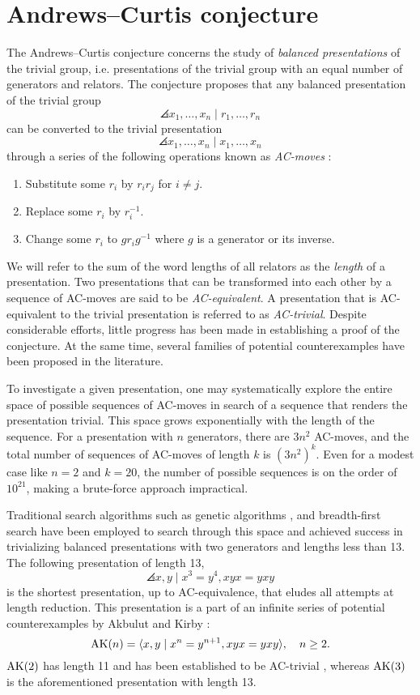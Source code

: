 
\section{Andrews--Curtis conjecture\label{sec:AC}}

The Andrews--Curtis conjecture concerns the study of \textit{balanced presentations} of the trivial group, i.e.
presentations of the trivial group with an equal number of generators and relators.
The conjecture proposes that any balanced presentation of the trivial group
\[
\angles{x_1, \dots, x_n \mid r_1, \dots, r_n}
\]
can be converted to the trivial presentation
\[
\angles{x_1, \dots, x_n \mid x_1, \dots, x_n}
\]
through a series of the following operations known as \textit{AC-moves} \cite{Andrews--Curtis}:
\begin{enumerate}[label=(AC\arabic*)]
	\item Substitute some $r_i$ by $r_i r_j$ for $i \neq j$.
	\item Replace some $r_i$ by $r_i^{-1}$.
	\item Change some $r_i$ to $g r_i g^{-1}$ where $g$ is a generator or its inverse.
\end{enumerate}

We will refer to the sum of the word lengths of all relators as the \textit{length} of a presentation.
Two presentations that can be transformed into each other by a sequence of AC-moves are said to be \textit{AC-equivalent}.
A presentation that is AC-equivalent to the trivial presentation is referred to as \textit{AC-trivial}.
Despite considerable efforts, little progress has been made in establishing a proof of the conjecture.
At the same time, several families of potential counterexamples have been proposed in the literature.

To investigate a given presentation, one may systematically explore the entire space of possible sequences of AC-moves in search of a sequence that renders the presentation trivial.
This space grows exponentially with the length of the sequence.
For a presentation with $n$ generators, there are $3n^2$ AC-moves, and the total number of sequences of AC-moves of length $k$ is $(3n^2)^k$.
Even for a modest case like $n=2$ and $k=20$, the number of possible sequences is on the order of $10^{21}$, making a brute-force approach impractical.

Traditional search algorithms such as genetic algorithms \cite{genetic}, and breadth-first search \cite{bfs-ac} have been employed to search through this space and achieved success in trivializing balanced presentations with two generators and lengths less than 13.
The following presentation of length 13,
\[
\angles{x, y \mid x^3 = y^4, xyx = yxy}
\]
is the shortest presentation, up to AC-equivalence, that eludes all attempts at length reduction.
This presentation is a part of an infinite series of potential counterexamples by Akbulut and Kirby \cite{Akbulut--Kirby}:
\[
\text{AK}(n) = \langle x, y \mid x^n = y^{n+1}, xyx = yxy\rangle, \quad n \geq 2.
\]
$\text{AK}(2)$ has length 11 and has been established to be AC-trivial \cite{genetic}, whereas $\text{AK}(3)$ is the aforementioned presentation with length 13.

